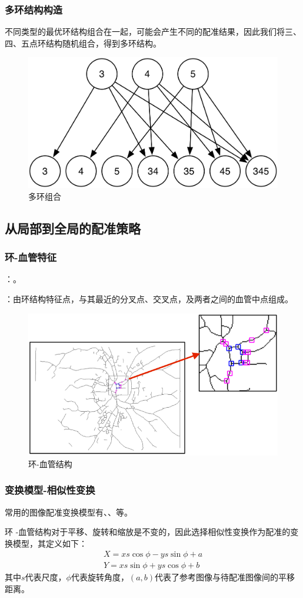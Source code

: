 \documentclass[notheorems,mathserif,table,compress]{beamer}  %
\begin{document}
 \begin{frame}
 \frametitle{多环结构构造}
 不同类型的最优环结构组合在一起，可能会产生不同的配准结果，因此我们将三、四、五点环结构随机组合，得到多环结构。
    \begin{figure}[ht!]
    \centering
  \includegraphics[width=0.6\linewidth]{345.png}
  \caption{多环组合}
 \end{figure}
 \setlength{\fboxsep}{2pt}%
\centering
{}
\end{frame}

\subsection{从局部到全局的配准策略}

 \begin{frame}
 \frametitle{环-血管特征}
{\color{blue}{环结构}}：{\color{red}{缺点：有限特征点、视网膜血管信息未考虑到}}。
 
{\color{blue}{环-血管结构 }}：由环结构特征点，与其最近的分叉点、交叉点，及两者之间的血管中点组成。
    \begin{figure}[ht!]
    \centering
  \includegraphics[width=0.7\linewidth]{环血管.png}
  \caption{环-血管结构}
 \end{figure}
\end{frame}

 \begin{frame}
 \frametitle{变换模型-相似性变换}
 常用的图像配准变换模型有{\color{blue}{相似性变换}}、{\color{blue}{仿射变换}}、{\color{blue}{多项式变换}}等。
 
 环 -血管结构对于平移、旋转和缩放是不变的，因此选择相似性变换作为配准的变换模型，其定义如下：
 \begin{equation}
\begin{split}		
X=xs\cos\phi-ys\sin\phi+a\\
Y=xs\sin\phi+ys\cos\phi+b	
\end{split}
\end{equation}
其中$s$代表尺度，$\phi$代表旋转角度，$(a,b)$代表了参考图像与待配准图像间的平移距离。
\end{frame}
\end{document}
